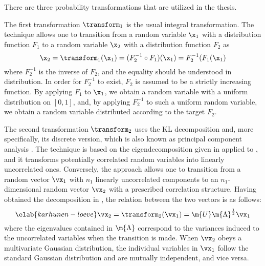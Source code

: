 There are three probability transformations that are utilized in the thesis.

The first transformation $\transform_1$ is the usual integral transformation.
The technique allows one to transition from a random variable $\x_1$ with a
distribution function $F_1$ to a random variable $\x_2$ with a distribution
function $F_2$ as
\[
  \x_2 = \transform_1(\x_1) = (F_2^{-1} \circ F_1)(\x_1) = F_2^{-1}(F_1(\x_1)
\]
where $F_2^{-1}$ is the inverse of $F_2$, and the equality should be understood
in distribution. In order for $F_2^{-1}$ to exist, $F_2$ is assumed to be a
strictly increasing function. By applying $F_1$ to $\x_1$, we obtain a random
variable with a uniform distribution on $[0, 1]$, and, by applying $F_2^{-1}$ to
such a uniform random variable, we obtain a random variable distributed
according to the target $F_2$.

The second transformation $\transform_2$ uses the \ac{KL} decomposition
\cite{ghanem1991, xiu2010} and, more specifically, its discrete version, which
is also known as principal component analysis \cite{hastie2013}. The technique
is based on the eigendecomposition given in  applied to
, and it transforms potentially correlated random
variables into linearly uncorrelated ones. Conversely, the approach allows one
to transition from a random vector $\vx_1$ with $n_1$ linearly uncorrelated
components to an $n_1$-dimensional random vector $\vx_2$ with a prescribed
correlation structure. Having obtained the decomposition in
, the relation between the two vectors is as follows:
\begin{equation} \elab{karhunen-loeve}
  \vx_2 = \transform_2(\vx_1) = \m{U} \m{\Lambda}^\frac{1}{2} \vx_1
\end{equation}
where the eigenvalues contained in $\m{\Lambda}$ correspond to the variances
induced to the uncorrelated variables when the transition is made. When $\vx_2$
obeys a multivariate Gaussian distribution, the individual variables in $\vx_1$
follow the standard Gaussian distribution and are mutually independent, and vice
versa.

